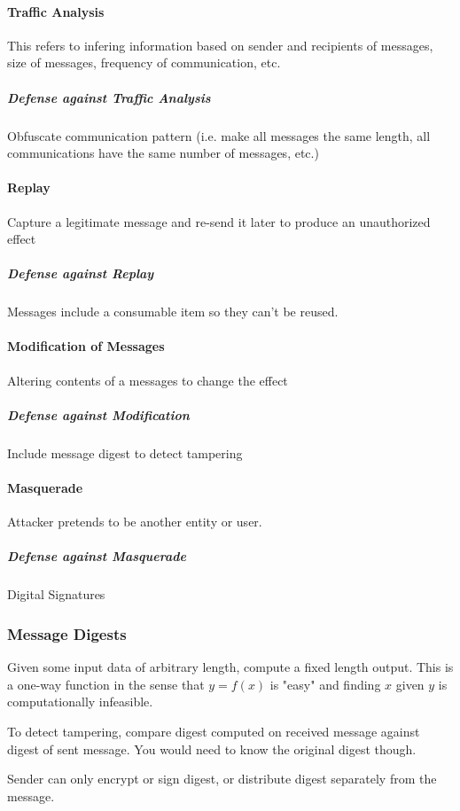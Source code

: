 \documentclass{article}
\begin{document}
\paragraph{Traffic Analysis} This refers to infering information based on sender and recipients of messages, size of messages, frequency of communication, etc.

\subparagraph{Defense against Traffic Analysis} Obfuscate communication pattern (i.e. make all messages the same length, all communications have the same number of messages, etc.)

\paragraph{Replay} Capture a legitimate message and re-send it later to produce an unauthorized effect

\subparagraph{Defense against Replay} Messages include a consumable item so they can't be reused.

\paragraph{Modification of Messages} Altering contents of a messages to change the effect

\subparagraph{Defense against Modification} Include message digest to detect tampering

\paragraph{Masquerade} Attacker pretends to be another entity or user.

\subparagraph{Defense against Masquerade} Digital Signatures

\subsubsection{Message Digests}

Given some input data of arbitrary length, compute a fixed length output. This is a one-way function in the sense that $y=f(x)$ is "easy" and finding $x$ given $y$ is computationally infeasible.

To detect tampering, compare digest computed on received message against digest of sent message. You would need to know the original digest though.

Sender can only encrypt or sign digest, or distribute digest separately from the message.
\end{document}
